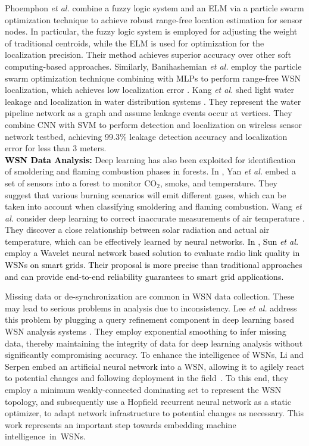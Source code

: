 \documentclass[journal,comsoc,letter]{IEEEtran}
\newcommand{\rev}[1]{\textcolor{black}{#1}}
\begin{document}
Phoemphon \emph{et al.} \cite{phoemphon2018hybrid} combine a fuzzy logic system and an ELM via a particle swarm optimization technique to achieve robust range-free location estimation for sensor nodes. In particular, the fuzzy logic system is employed for adjusting the weight of traditional centroids, while the ELM is used for optimization for the localization precision. Their method achieves superior accuracy over other soft computing-based approaches. Similarly, Banihashemian \emph{et al.} employ the particle swarm optimization technique combining with MLPs to perform range-free WSN localization, which achieves low localization error \cite{banihashemian2018new}. Kang \emph{et al.} shed light water leakage and localization in water distribution systems \cite{kang2018novel}. They represent the water pipeline network as a graph and assume leakage events occur at vertices. They combine CNN with SVM to perform detection and localization on wireless sensor network testbed, achieving 99.3\% leakage detection accuracy and localization error for less than 3 meters.\\

\rev{\noindent \textbf{WSN Data Analysis:}} Deep learning has also been exploited for identification of smoldering and flaming combustion phases in forests. In \cite{yan2016real}, Yan \emph{et al.} embed a set of sensors into a forest to monitor CO$_2$, smoke, and temperature.  They suggest that various burning scenarios will emit different gases, which can be taken into account when classifying smoldering and flaming combustion. Wang \emph{et al.} consider deep learning to correct inaccurate measurements of air temperature \cite{wang2017temperature}. They discover a close relationship between solar radiation and actual air temperature, which can be effectively learned by neural networks. \rev{In \cite{sun2017wnn}, Sun \emph{et al.} employ a Wavelet neural network based solution to evaluate radio link quality in WSNs on smart grids. Their proposal is more precise than traditional approaches and can provide end-to-end reliability guarantees to smart grid applications. }

Missing data or de-synchronization are common in WSN data collection. These may lead to serious problems in analysis due to inconsistency. Lee \emph{et al.} address this problem by plugging a query refinement component in deep learning based WSN analysis systems \cite{lee2017deep222}. They employ exponential smoothing to infer missing data, thereby maintaining the integrity of data for deep learning analysis without significantly compromising  accuracy. To enhance the intelligence of WSNs, Li and Serpen embed an artificial neural network into a WSN, allowing it to agilely react to potential changes and following deployment in the field~\cite{li2016adaptive}. To this end, they employ a minimum weakly-connected dominating set to represent the WSN topology, and subsequently use a Hopfield recurrent neural network as a static optimizer, to adapt network infrastructure to potential changes as necessary. This work represents an important step towards embedding machine \mbox{intelligence in WSNs}. \\
\end{document}
